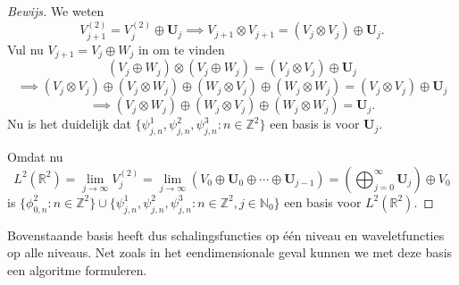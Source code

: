 \documentclass[11pt]{report}
\newcommand{\R}{\mathbb{R}}
\newcommand{\N}{\mathbb{N}}
\newcommand{\Z}{\mathbb{Z}}
\theoremstyle{plain}
\theoremstyle{remark}
\begin{document}
\begin{proof}[Bewijs]
We weten
\[
	V_{j+1}^{(2)} = V_j^{(2)} \oplus \boldsymbol{U}_j \implies V_{j+1} \otimes V_{j+1} = ( V_j \otimes V_j ) \oplus \boldsymbol{U}_j.
\]
Vul nu $V_{j+1} = V_j \oplus W_j$ in om te vinden
\[
	( V_j \oplus W_j ) \otimes (V_j \oplus W_j ) = (V_j \otimes V_j) \oplus \boldsymbol{U}_j
\]
\[
	\implies (V_j \otimes V_j) \oplus (V_j \otimes W_j) \oplus (W_j \otimes V_j) \oplus (W_j \otimes W_j) = (V_j \otimes V_j) \oplus \boldsymbol{U}_j
\]
\[
	\implies (V_j \otimes W_j) \oplus (W_j \otimes V_j) \oplus (W_j \otimes W_j) = \boldsymbol{U}_j.
\]
Nu is het duidelijk dat $\{ \psi^1_{j,n}, \psi^2_{j,n}, \psi^3_{j,n}: n \in \Z^2 \}$ een basis is voor $\boldsymbol{U}_j$. 

Omdat nu
\[
	L^2(\R^2) = \lim_{j \to \infty} V_j^{(2)} = \lim_{j \to \infty} ( V_0 \oplus \boldsymbol{U}_0 \oplus \cdots \oplus \boldsymbol{U}_{j-1} ) = \left( \bigoplus_{j=0}^\infty \boldsymbol{U}_j \right) \oplus V_0
\]
is $\{ \phi_{0, n}^2: n \in \Z^2 \} \cup \{ \psi^1_{j,n}, \psi^2_{j,n}, \psi^3_{j,n}: n \in \Z^2, j \in \N_0 \}$ een basis voor $L^2(\R^2)$.
\end{proof}

Bovenstaande basis heeft dus schalingsfuncties op \'e\'en niveau en waveletfuncties op alle niveaus. Net zoals in het eendimensionale geval kunnen we met deze basis een algoritme formuleren.
\end{document}
